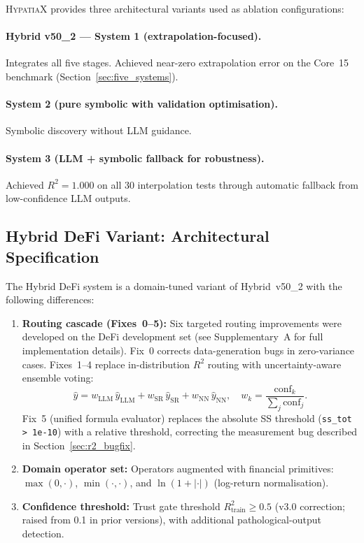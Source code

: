 \documentclass[twoside,11pt]{article}
\begin{document}
\textsc{HypatiaX} provides three architectural variants used as ablation
configurations:

\paragraph{Hybrid v50\_2 --- System 1 (extrapolation-focused).}
Integrates all five stages.  Achieved near-zero extrapolation error on the
Core~15 benchmark (Section~\ref{sec:five_systems}).

\paragraph{System 2 (pure symbolic with validation optimisation).}
Symbolic discovery without LLM guidance.

\paragraph{System 3 (LLM + symbolic fallback for robustness).}
Achieved $R^2 = 1.000$ on all 30 interpolation tests through automatic
fallback from low-confidence LLM outputs.

\subsection{Hybrid DeFi Variant: Architectural Specification}\label{subsec:hybrid-defi-variant-architectural-specif}
\label{sec:hybrid_defi_spec}

The Hybrid DeFi system is a domain-tuned variant of Hybrid~v50\_2 with the
following differences:

\begin{enumerate}
\item \textbf{Routing cascade (Fixes~0--5):} Six targeted routing improvements
  were developed on the DeFi development set (see Supplementary~A for full
  implementation details).  Fix~0 corrects data-generation bugs in zero-variance
  cases.  Fixes~1--4 replace in-distribution $R^2$ routing with uncertainty-aware
  ensemble voting:
  \[
    \hat{y} = w_\mathrm{LLM}\,\hat{y}_\mathrm{LLM}
             + w_\mathrm{SR}\,\hat{y}_\mathrm{SR}
             + w_\mathrm{NN}\,\hat{y}_\mathrm{NN},
    \quad w_k = \frac{\mathrm{conf}_k}{\sum_j \mathrm{conf}_j}.
  \]
  Fix~5 (unified formula evaluator) replaces the absolute SS threshold
  (\texttt{ss\_tot > 1e-10}) with a relative threshold, correcting the
  measurement bug described in Section~\ref{sec:r2_bugfix}.
\item \textbf{Domain operator set:} Operators augmented with financial
  primitives: $\max(0,\cdot)$, $\min(\cdot,\cdot)$, and
  $\ln(1+|\cdot|)$ (log-return normalisation).
\item \textbf{Confidence threshold:} Trust gate threshold $R^2_{\mathrm{train}} \geq 0.5$
  (v3.0 correction; raised from 0.1 in prior versions), with additional
  pathological-output detection.
\end{enumerate}
\end{document}
